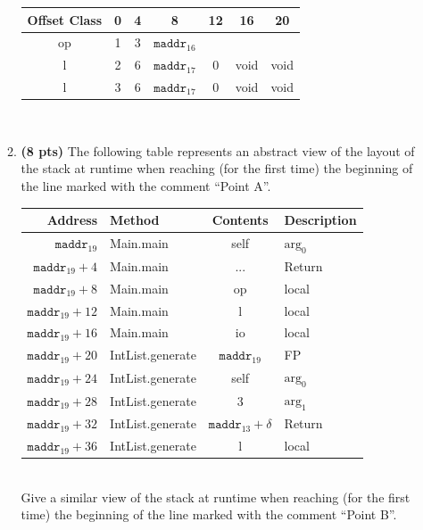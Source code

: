 \documentclass[11pt]{article}
\begin{document}
\begin{enumerate}
\begin{enumerate}
    \begin{tabular}{|c|c|c|c|c|c|c|}
    \hline
    Offset Class & 0 & 4 & 8 & 12 & 16 & 20 \\
    \hline
    op & 1 & 3 & $\mathtt{maddr}_{16}$ &  &  &  \\
    \hline
    l & 2 & 6 & $\mathtt{maddr}_{17}$ & 0 & void & void \\
    \hline
    l & 3 & 6 & $\mathtt{maddr}_{17}$ & 0 & void & void \\
    \hline
    \end{tabular} \\
	
    
   \newpage

    \item \textbf{(8 pts)} The following table represents an abstract view of the layout of the stack at runtime when reaching (for the first time) the beginning of the line marked with the comment ``Point A''. \\
    
    \begin{tabular}{ | r | l | c | l | }
    \hline
    Address & Method & Contents & Description \\
    \hline
    $\mathtt{maddr}_{19}$ & Main.main & self & $\mbox{arg}_0$ \\
    \hline
    $\mathtt{maddr}_{19}+4$ & Main.main & ... & Return \\
    \hline
    $\mathtt{maddr}_{19}+8$ & Main.main & op & local \\
    \hline
    $\mathtt{maddr}_{19}+12$ & Main.main & l & local \\
    \hline
    $\mathtt{maddr}_{19}+16$ & Main.main & io & local \\
    \hline
    $\mathtt{maddr}_{19}+20$ & IntList.generate & $\mathtt{maddr}_{19}$ & FP \\
    \hline
    $\mathtt{maddr}_{19}+24$ & IntList.generate & self & $\mbox{arg}_0$ \\
    \hline
    $\mathtt{maddr}_{19}+28$ & IntList.generate & 3 & $\mbox{arg}_1$ \\
    \hline
    $\mathtt{maddr}_{19}+32$ & IntList.generate & $\mathtt{maddr}_{13}+\delta$ & Return \\
    \hline
    $\mathtt{maddr}_{19}+36$ & IntList.generate & l & local \\
    \hline
    \end{tabular} \\
    
    Give a similar view of the stack at runtime when reaching (for the first time) the beginning of the line marked with the comment ``Point B''.\\


\end{enumerate}
\end{enumerate}
\end{document}
